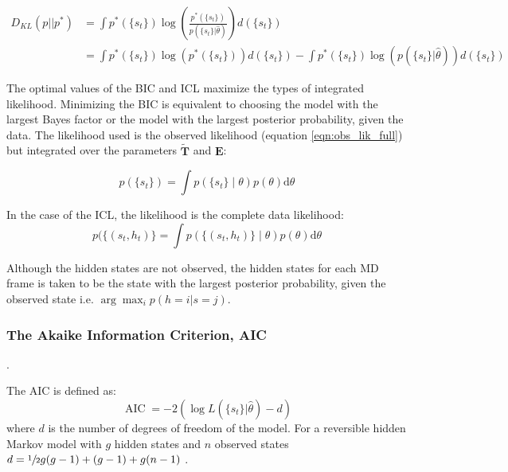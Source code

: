 \begin{equation}\label{eqn:kl_div}
\begin{split}
    D_{KL}(p||p^*) & = \int p^{*}(\{s_t\}) \log{\left(\frac{ p^{*}(\{s_t\}) }{p(\{s_t\} | \hat{\theta})}  \right)} d(\{s_t\}) \\ 
    & = \int p^{*}(\{s_t\}) \log{\left(p^{*}(\{s_t\})\right)}d(\{s_t\}) - \int p^{*}(\{s_t\})\log{\left(p(\{s_t\} | \hat{\theta})\right)} d(\{s_t\})
\end{split}
\end{equation}

The optimal values of the BIC and ICL maximize the types of integrated likelihood. Minimizing the BIC is equivalent to choosing the model with the largest Bayes factor or the model with the largest posterior probability, given the data. The likelihood used is the observed likelihood (equation \ref{eqn:obs_lik_full}) but integrated over the parameters $\tilde{\mathbf{T}}$ and $\mathbf{E}$: 

\begin{equation}\label{eqn:obs_lik_int}
        p(\{s_t\}) = \int p\left(\{s_{t}\}\middle |\theta \right)p(\theta) \mathrm{d}\theta
\end{equation}

In the case of the ICL, the likelihood is the complete data likelihood: 
\begin{equation}\label{eqn:class_lik_int}
    p(\{(s_t, h_t)\} = \int p\left(\{(s_{t}, h_{t})\}\middle |\theta \right)p(\theta) \mathrm{d}\theta
\end{equation}

Although the hidden states are not observed, the hidden states for each MD frame is  taken to be the state with the largest posterior probability, given the observed state i.e. $\arg\max_{i}p(h=i|s=j)$.  


\subsubsection{The Akaike Information Criterion, AIC}. 

The AIC is defined as:
\begin{equation}\label{eqn:aic}
    \operatorname{AIC} = -2\left(\log{L\left(\{s_t\}|\hat{\theta}\right)} - d\right)
\end{equation}
where $d$ is the number of degrees of freedom of the model. For a reversible hidden Markov model with $g$ hidden states and $n$ observed states  $d = \sfrac{1}{2}g(g-1) + (g-1) + g(n-1)$ \cite{trendelkamp-schroerEstimationUncertaintyReversible2015b}. 


